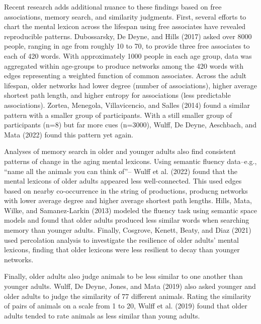 \documentclass[
  man]{apa6}
\begin{document}
Recent research adds additional nuance to these findings based on free associations, memory search, and similarity judgments. First, several efforts to chart the mental lexicon across the lifespan using free associates have revealed reproducible patterns. Dubossarsky, De Deyne, and Hills (2017) asked over 8000 people, ranging in age from roughly 10 to 70, to provide three free associates to each of 420 words. With approximately 1000 people in each age group, data was aggregated within age-groups to produce networks among the 420 words with edges representing a weighted function of common associates. Across the adult lifespan, older networks had lower degree (number of associations), higher average shortest path length, and higher entropy for associations (less predictable associations). Zortea, Menegola, Villavicencio, and Salles (2014) found a similar pattern with a smaller group of participants. With a still smaller group of participants (n=8) but far more cues (n=3000), Wulff, De Deyne, Aeschbach, and Mata (2022) found this pattern yet again.

Analyses of memory search in older and younger adults also find consistent patterns of change in the aging mental lexicons. Using semantic fluency data--e.g., ``name all the animals you can think of''-- Wulff et al. (2022) found that the mental lexicons of older adults appeared less well-connected. This used edges based on nearby co-occurrence in the string of productions, producng networks with lower average degree and higher average shortest path lengths. Hills, Mata, Wilke, and Samanez-Larkin (2013) modeled the fluency task using semantic space models and found that older adults produced less similar words when searching memory than younger adults. Finally, Cosgrove, Kenett, Beaty, and Diaz (2021) used percolation analysis to investigate the resilience of older adults' mental lexicons, finding that older lexicons were less resilient to decay than younger networks.

Finally, older adults also judge animals to be less similar to one another than younger adults. Wulff, De Deyne, Jones, and Mata (2019) also asked younger and older adults to judge the similarity of 77 different animals. Rating the similarity of pairs of animals on a scale from 1 to 20, Wulff et al. (2019) found that older adults tended to rate animals as less similar than young adults.
\end{document}
